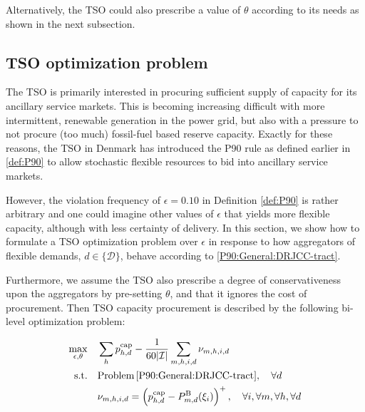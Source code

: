 \documentclass[conference]{IEEEtran}
\begin{document}
Alternatively, the \ac{TSO} could also prescribe a value of $\theta$ according to its needs as shown in the next subsection.


\subsection{\ac{TSO} optimization problem}

The \ac{TSO} is primarily interested in procuring sufficient supply of capacity for its ancillary service markets. This is becoming increasing difficult with more intermittent, renewable generation in the power grid, but also with a pressure to not procure (too much) fossil-fuel based reserve capacity. Exactly for these reasons, the \ac{TSO} in Denmark has introduced the P90 rule as defined earlier in \ref{def:P90} to allow stochastic flexible resources to bid into ancillary service markets.

However, the violation frequency of $\epsilon = 0.10$ in Definition \ref{def:P90} is rather arbitrary and one could imagine other values of $\epsilon$ that yields more flexible capacity, although with less certainty of delivery. In this section, we show how to formulate a \ac{TSO} optimization problem over $\epsilon$ in response to how aggregators of flexible demands, $d \in \{\mathcal{D} \}$, behave according to \eqref{P90:General:DRJCC-tract}.

Furthermore, we assume the \ac{TSO} also prescribe a degree of conservativeness upon the aggregators by pre-setting $\theta$, and that it ignores the cost of procurement. Then \ac{TSO} capacity procurement is described by the following bi-level optimization problem:

\begin{subequations}\label{P90:TSO}
    \begin{align}
        \max_{\epsilon, \theta} \quad & \sum_h p_{h,d}^{\text{cap}} -  \frac{1}{60|\mathcal{I}|}\sum_{m,h,i,d} \nu_{m,h,i,d}                                                                                                                                                                                                      \\
        \text{s.t.} \quad               & \text{Problem} \thinspace \eqref{P90:General:DRJCC-tract}, \quad \forall{d} \label{P90:TSO:inner} \\
        & \nu_{m,h,i,d} = \left(p_{h,d}^{\text{cap}} - P_{m,d}^{\text{B}}(\xi_i) \right)^{+}, \quad \forall{i}, \forall{m}, \forall{h}, \forall{d}
    \end{align}
\end{subequations}
\end{document}
